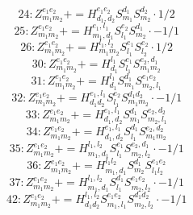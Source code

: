 \documentclass[letterpaper,10pt,fleqn,leqno,onecolumn]{article}
\begin{document}
\begin{equation} \;\;\;\;\;\;  24: Z^{e_{1}e_{2}}_{m_{1}m_{2}}+=H^{e_{1}e_{2}}_{d_{1},d_{2}}S^{d_{1}}_{m_{1}}S^{d_{2}}_{m_{2}}\cdot 1/2 \end{equation}
\begin{equation} \;\;\;\;\;\;  25: Z^{e_{1}e_{2}}_{m_{1}m_{2}}+=H^{e_{1},l_{1}}_{m_{1},d_{1}}S^{e_{2}}_{l_{1}}S^{d_{1}}_{m_{2}}\cdot -1/1 \end{equation}
\begin{equation} \;\;\;\;\;\;  26: Z^{e_{1}e_{2}}_{m_{1}m_{2}}+=H^{l_{1},l_{2}}_{m_{1}m_{2}}S^{e_{1}}_{l_{1}}S^{e_{2}}_{l_{2}}\cdot 1/2 \end{equation}
\begin{equation} \;\;\;\;\;\;  30: Z^{e_{1}e_{2}}_{m_{1}m_{2}}+=H^{l_{1}}_{d_{1}}S^{e_{1}}_{l_{1}}S^{e_{2},d_{1}}_{m_{1}m_{2}} \end{equation}
\begin{equation} \;\;\;\;\;\;  31: Z^{e_{1}e_{2}}_{m_{1}m_{2}}+=H^{l_{1}}_{d_{1}}S^{d_{1}}_{m_{1}}S^{e_{1}e_{2}}_{m_{2},l_{1}} \end{equation}
\begin{equation} \;\;\;\;\;\;  32: Z^{e_{1}e_{2}}_{m_{1}m_{2}}+=H^{e_{1},l_{1}}_{d_{1}d_{2}}S^{e_{2}}_{l_{1}}S^{d_{1}d_{2}}_{m_{1}m_{2}}\cdot -1/1 \end{equation}
\begin{equation} \;\;\;\;\;\;  33: Z^{e_{1}e_{2}}_{m_{1}m_{2}}+=H^{e_{1},l_{1}}_{d_{1},d_{2}}S^{d_{1}}_{m_{1}}S^{e_{2},d_{2}}_{m_{2},l_{1}} \end{equation}
\begin{equation} \;\;\;\;\;\;  34: Z^{e_{1}e_{2}}_{m_{1}m_{2}}+=H^{e_{1},l_{1}}_{d_{1},d_{2}}S^{d_{1}}_{l_{1}}S^{e_{2},d_{2}}_{m_{1}m_{2}} \end{equation}
\begin{equation} \;\;\;\;\;\;  35: Z^{e_{1}e_{2}}_{m_{1}m_{2}}+=H^{l_{1},l_{2}}_{m_{1},d_{1}}S^{e_{1}}_{l_{1}}S^{e_{2},d_{1}}_{m_{2},l_{2}}\cdot -1/1 \end{equation}
\begin{equation} \;\;\;\;\;\;  36: Z^{e_{1}e_{2}}_{m_{1}m_{2}}+=H^{l_{1}l_{2}}_{m_{1},d_{1}}S^{d_{1}}_{m_{2}}S^{e_{1}e_{2}}_{l_{1}l_{2}} \end{equation}
\begin{equation} \;\;\;\;\;\;  37: Z^{e_{1}e_{2}}_{m_{1}m_{2}}+=H^{l_{1},l_{2}}_{m_{1},d_{1}}S^{d_{1}}_{l_{1}}S^{e_{1}e_{2}}_{m_{2},l_{2}}\cdot -1/1 \end{equation}
\begin{equation} \;\;\;\;\;\;  42: Z^{e_{1}e_{2}}_{m_{1}m_{2}}+=H^{l_{1},l_{2}}_{d_{1}d_{2}}S^{e_{1}e_{2}}_{m_{1},l_{1}}S^{d_{1}d_{2}}_{m_{2},l_{2}}\cdot -1/1 \end{equation}
\end{document}
